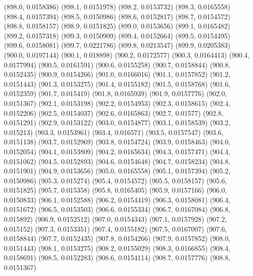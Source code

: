 {					(898.0, 0.0158386)
					(898.1, 0.0151978)
					(898.2, 0.0153732)
					(898.3, 0.0165558)
					(898.4, 0.0157394)
					(898.5, 0.0150986)
					(898.6, 0.0152817)
					(898.7, 0.0154572)
					(898.8, 0.0158157)
					(898.9, 0.0151825)
					(899.0, 0.0153656)
					(899.1, 0.0165482)
					(899.2, 0.0157318)
					(899.3, 0.0150909)
					(899.4, 0.0152664)
					(899.5, 0.0154495)
					(899.6, 0.0158081)
					(899.7, 0.0221786)
					(899.8, 0.0213547)
					(899.9, 0.0205383)
					(900.0, 0.0197144)
					(900.1, 0.018898)
					(900.2, 0.0172577)
					(900.3, 0.0164413)
					(900.4, 0.0177994)
					(900.5, 0.0161591)
					(900.6, 0.0155258)
					(900.7, 0.0158844)
					(900.8, 0.0152435)
					(900.9, 0.0154266)
					(901.0, 0.0166016)
					(901.1, 0.0157852)
					(901.2, 0.0151443)
					(901.3, 0.0153275)
					(901.4, 0.0155182)
					(901.5, 0.0158768)
					(901.6, 0.0152359)
					(901.7, 0.015419)
					(901.8, 0.0165939)
					(901.9, 0.0157776)
					(902.0, 0.0151367)
					(902.1, 0.0153198)
					(902.2, 0.0154953)
					(902.3, 0.0158615)
					(902.4, 0.0152206)
					(902.5, 0.0154037)
					(902.6, 0.0165863)
					(902.7, 0.01577)
					(902.8, 0.0151291)
					(902.9, 0.0153122)
					(903.0, 0.0154877)
					(903.1, 0.0158539)
					(903.2, 0.015213)
					(903.3, 0.0153961)
					(903.4, 0.016571)
					(903.5, 0.0157547)
					(903.6, 0.0151138)
					(903.7, 0.0152969)
					(903.8, 0.0154724)
					(903.9, 0.0158463)
					(904.0, 0.0152054)
					(904.1, 0.0153809)
					(904.2, 0.0165634)
					(904.3, 0.0157471)
					(904.4, 0.0151062)
					(904.5, 0.0152893)
					(904.6, 0.0154648)
					(904.7, 0.0158234)
					(904.8, 0.0151901)
					(904.9, 0.0153656)
					(905.0, 0.0165558)
					(905.1, 0.0157394)
					(905.2, 0.0150986)
					(905.3, 0.015274)
					(905.4, 0.0154572)
					(905.5, 0.0158157)
					(905.6, 0.0151825)
					(905.7, 0.015358)
					(905.8, 0.0165405)
					(905.9, 0.0157166)
					(906.0, 0.0150833)
					(906.1, 0.0152588)
					(906.2, 0.0154419)
					(906.3, 0.0158081)
					(906.4, 0.0151672)
					(906.5, 0.0153503)
					(906.6, 0.0155334)
					(906.7, 0.0167084)
					(906.8, 0.015892)
					(906.9, 0.0152512)
					(907.0, 0.0154343)
					(907.1, 0.0157928)
					(907.2, 0.015152)
					(907.3, 0.0153351)
					(907.4, 0.0155182)
					(907.5, 0.0167007)
					(907.6, 0.0158844)
					(907.7, 0.0152435)
					(907.8, 0.0154266)
					(907.9, 0.0157852)
					(908.0, 0.0151443)
					(908.1, 0.0153275)
					(908.2, 0.0155029)
					(908.3, 0.0166855)
					(908.4, 0.0158691)
					(908.5, 0.0152283)
					(908.6, 0.0154114)
					(908.7, 0.0157776)
					(908.8, 0.0151367)
}

